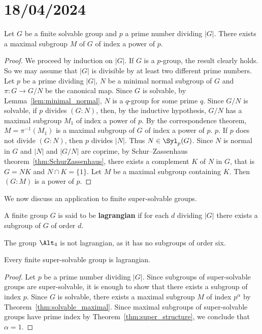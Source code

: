 \section{18/04/2024}

\begin{theorem}
	\label{thm:solvable_maximal}
	Let $G$ be a finite solvable group and $p$ a prime number dividing $|G|$. There exists a maximal 
    subgroup $M$ of $G$ of index a power of $p$. 
\end{theorem}

\begin{proof}
	We proceed by induction on $|G|$. If $G$ is a $p$-group, the result clearly holds. So we may assume that $|G|$ is divisible by at least two different prime numbers. 
    Let $p$ be a prime dividing $|G|$, $N$ be a minimal normal subgroup of $G$ and 
    $\pi\colon G\to G/N$ be the canonical map. Since $G$ is solvable, by Lemma~\ref{lem:minimal_normal}, 
    $N$ is a $q$-group for some prime $q$. Since $G/N$ is solvable, if $p$ divides 
	$(G:N)$, then, by the inductive hypothesis, $G/N$ has a maximal subgroup 
 	$M_1$ of index a power of $p$. By the correspondence theorem, 
  $M=\pi^{-1}(M_1)$ is a maximal subgroup of $G$ of index a power of $p$. 
  $p$. If $p$ does not divide $(G:N)$, then $p$ divides $|N|$. Thus 
	$N\in\Syl_p(G)$. Since $N$ is normal in $G$ and $|N|$ and $|G/N|$ are coprime, by 
	Schur--Zassenhaus theorem~\ref{thm:SchurZassenhaus}, 
	there exists a complement $K$ of $N$ in $G$, that is $G=NK$ and $N\cap K=\{1\}$. Let 
	$M$ be a maximal subgroup containing $K$. Then $(G:M)$ is a power of $p$. 
\end{proof}

We now discuss an application to finite super-solvable groups. 

\begin{definition}
	A finite group $G$ is said to be \textbf{lagrangian} if for each $d$ dividing $|G|$ 
	there exists a subgroup of $G$ of order $d$.
\end{definition}

The group $\Alt_4$ is not lagrangian, as it has no subgroups of order six. 

\begin{theorem}
	Every finite super-solvable group is lagrangian. 
\end{theorem}

\begin{proof}
	Let $p$ be a prime number dividing $|G|$. Since subgroups of super-solvable groups are super-solvable, it is enough to 
    show that there exists a subgroup of index $p$. 
	Since $G$ is solvable, there exists a maximal subgroup $M$ of index 
	$p^{\alpha}$ by Theorem~\ref{thm:solvable_maximal}. Since maximal 
 subgroups of super-solvable groups have prime index 
    by Theorem~\ref{thm:super_structure}, we conclude that $\alpha=1$.
\end{proof}

